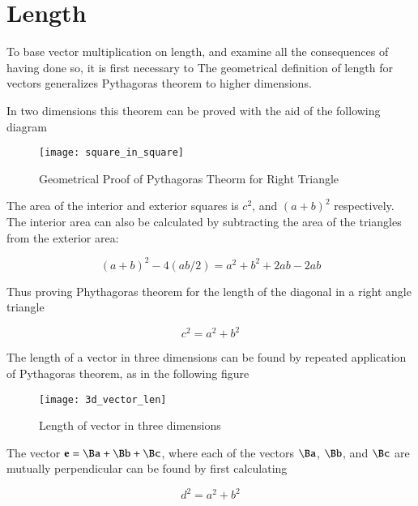 \documentclass{article}      %
\title{} %
\author{Peeter Joot}         %
\begin{document}

\maketitle{}

\section{Length}

To base vector multiplication on length, and examine all the consequences of having done so, it is first necessary to 
The geometrical definition of length for vectors generalizes Pythagoras theorem to higher dimensions.

In two dimensions this theorem can be proved with the aid of the following diagram

\begin{figure}[htp]
\centering
\texttt{[image: square\_in\_square]}
\caption{Geometrical Proof of Pythagoras Theorm for Right Triangle}\label{fig:phthagoras}
\end{figure}

The area of the interior and exterior squares is $c^2$, and $(a+b)^2$ respectively.  The interior area can also be calculated by subtracting the area of the triangles from the exterior area:

\[
(a+b)^2 - 4(ab/2) = a^2 + b^2 + 2ab - 2ab
\]

Thus proving Phythagoras theorem for the length of the diagonal in a right angle triangle

\[
c^2 = a^2 + b^2
\]


The length of a vector in three dimensions can be found by repeated application of Pythagoras theorem, as in the following figure 

\begin{figure}[htp]
\centering
\texttt{[image: 3d\_vector\_len]}
\caption{Length of vector in three dimensions}\label{fig:3dveclen}
\end{figure}

The vector $\Be = \Ba + \Bb + \Bc$, where each of the vectors $\Ba$, $\Bb$, and $\Bc$ are mutually perpendicular can be found by first calculating

\[
d^2 = a^2 + b^2
\]
\end{document}
